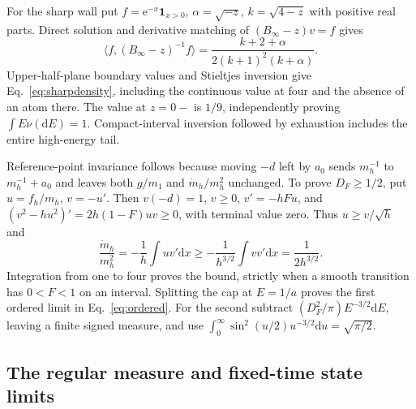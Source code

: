 \documentclass[aps,pra,reprint,superscriptaddress,longbibliography]{revtex4-2}
\newcommand{\dd}{\mathrm d}
\newcommand{\ee}{\mathrm e}
\newcommand{\ip}[2]{\langle#1,#2\rangle}
\newcommand{\one}{\mathbf 1}
\begin{document}
For the sharp wall put $f=\ee^{-x}\one_{x>0}$,
$\alpha=\sqrt{-z}$, $k=\sqrt{4-z}$ with positive real parts. Direct
solution and derivative matching of $(B_\infty-z)v=f$ gives
\begin{equation}
 \ip{f}{(B_\infty-z)^{-1}f}
          =\frac{k+2+\alpha}{2(k+1)^2(k+\alpha)}.         \label{eq:apsharpres}
\end{equation}
Upper-half-plane boundary values and Stieltjes inversion give
Eq.~\eqref{eq:sharpdensity}, including the continuous value at four
and the absence of an atom there. The value at $z=0-$ is $1/9$,
independently proving $\int E\nu(\dd E)=1$. Compact-interval
inversion followed by exhaustion includes the entire high-energy tail.

Reference-point invariance follows because moving $-d$ left by $a_0$
sends $m_h^{-1}$ to $m_h^{-1}+a_0$ and leaves both $g/m_1$ and
$\dot m_h/m_h^2$ unchanged. To prove $D_F\ge1/2$, put
$u=f_h/m_h$, $v=-u'$. Then $v(-d)=1$, $v\ge0$, $v'=-hFu$, and
$(v^2-hu^2)'=2h(1-F)uv\ge0$, with terminal value zero. Thus
$u\ge v/\sqrt h$ and
\begin{equation}
 \frac{\dot m_h}{m_h^2}
   =-\frac1h\int uv'\dd x
   \ge-\frac1{h^{3/2}}\int vv'\dd x
   =\frac1{2h^{3/2}}.                                    \label{eq:apscatteringbound}
\end{equation}
Integration from one to four proves the bound, strictly when a smooth
transition has $0<F<1$ on an interval. Splitting the cap at $E=1/a$
proves the first ordered limit in Eq.~\eqref{eq:ordered}. For the
second subtract $(D_F^2/\pi)E^{-3/2}\dd E$, leaving a finite signed
measure, and use
$\int_0^\infty\sin^2(u/2)u^{-3/2}\dd u=\sqrt{\pi/2}$.

\subsection{The regular measure and fixed-time state limits}
\end{document}
